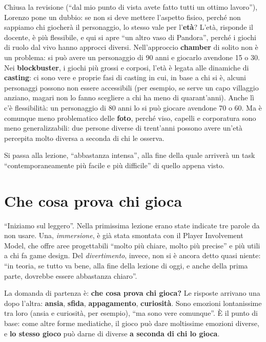 Chiusa la revisione (``dal mio punto di vista avete fatto tutti un ottimo
lavoro''), Lorenzo pone un dubbio: se non si deve mettere l'aspetto fisico, perché
non sappiamo chi giocherà il personaggio, lo stesso vale per l'\textbf{età}?
L'età, risponde il docente, è più flessibile, e qui si apre ``un altro vaso di
Pandora'', perché i giochi di ruolo dal vivo hanno approcci diversi. Nell'approccio
\textbf{chamber} di solito non è un problema: si può avere un personaggio di 90 anni
e giocarlo avendone 15 o 30. Nei \textbf{blockbuster}, i giochi più grossi e
corposi, l'età è legata alle dinamiche di \textbf{casting}: ci sono vere e proprie
fasi di casting in cui, in base a chi si è, alcuni personaggi possono non essere
accessibili (per esempio, se serve un capo villaggio anziano, magari non lo fanno
scegliere a chi ha meno di quarant'anni). Anche lì c'è flessibilità: un personaggio
di 80 anni lo si può giocare avendone 70 o 60. Ma è comunque meno problematico delle
\textbf{foto}, perché viso, capelli e corporatura sono meno generalizzabili: due
persone diverse di trent'anni possono avere un'età percepita molto diversa a seconda
di chi le osserva.

Si passa alla lezione, ``abbastanza intensa'', alla fine della quale arriverà un
task ``contemporaneamente più facile e più difficile'' di quello appena visto.

\section{Che cosa prova chi gioca}
\label{a5:sec:provare}

``Iniziamo sul leggero''. Nella primissima lezione erano state indicate tre parole
da non usare. Una, \emph{immersione}, è già stata smontata con il Player
Involvement Model, che offre aree progettabili ``molto più chiare, molto più
precise'' e più utili a chi fa game design. Del \emph{divertimento}, invece, non si
è ancora detto quasi niente: ``in teoria, se tutto va bene, alla fine della lezione
di oggi, e anche della prima parte, dovrebbe essere abbastanza chiaro''.

La domanda di partenza è: \textbf{che cosa prova chi gioca?} Le risposte arrivano
una dopo l'altra: \textbf{ansia}, \textbf{sfida}, \textbf{appagamento},
\textbf{curiosità}. Sono emozioni lontanissime tra loro (ansia e curiosità, per
esempio), ``ma sono vere comunque''. È il punto di base: come altre forme
mediatiche, il gioco può dare moltissime emozioni diverse, e \textbf{lo stesso
gioco} può darne di diverse \textbf{a seconda di chi lo gioca}.

